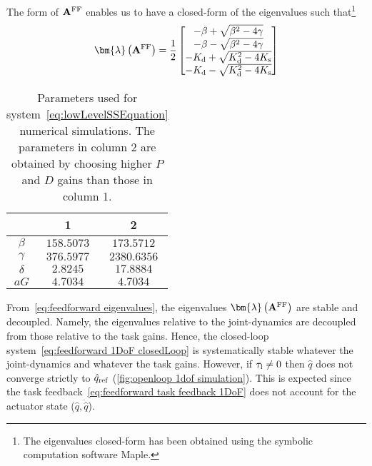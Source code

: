 The form of $\mathbf{A}^{\rm FF}$ enables us to have a closed-form of the eigenvalues such that\footnote{The eigenvalues closed-form has been obtained using the symbolic computation software Maple.} 
\begin{equation}\label{eq:feedforward eigenvalues}
	\bm{\lambda}\left(\mathbf{A}^{\rm FF}\right) = \frac{1}{2}\begin{bmatrix}
		-\beta + \sqrt{\beta^2 - 4\gamma} \\
		-\beta - \sqrt{\beta^2 - 4\gamma} \\
		-K_{\rm d}  + \sqrt{K_{\rm d}^2 - 4K_{\rm s} } \\
		-K_{\rm d}  - \sqrt{K_{\rm d}^2 - 4K_{\rm s} }    
	\end{bmatrix}
\end{equation}
\begin{table}
	\centering		
	\begin{tabular}{|c||c|c|}\hline
		&  1   &  2 \\\hline
		$\beta$&$158.5073$ &$173.5712$ \\\hline
		$\gamma$&$376.5977$ &$2380.6356$ \\\hline
		$\delta$&$2.8245$  &$17.8884$ \\	\hline
		$aG$&$4.7034$    &$4.7034$\\\hline
	\end{tabular}
\caption{Parameters used for system~\eqref{eq:lowLevelSSEquation} numerical simulations. The parameters in column 2 are obtained by choosing higher $P$ and $D$ gains than those in column 1.}
\label{tab:parameters}
\end{table}
From~\cref{eq:feedforward eigenvalues}, the eigenvalues $\bm{\lambda}\left(\mathbf{A}^{\rm FF}\right)$ are stable and decoupled. Namely,  the eigenvalues relative to the joint-dynamics are decoupled from those relative to the task gains. Hence, the closed-loop system~\eqref{eq:feedforward 1DoF closedLoop} is systematically stable whatever the joint-dynamics and whatever the task gains. However, if $\tau_{\rm l}\neq 0 $ then $\hat{q}$ does not converge strictly to $\hat{q}_{\rm ref}$ (\cref{fig:openloop 1dof simulation}). This is expected since the task feedback~\eqref{eq:feedforward task feedback 1DoF} does not account for the actuator state ($\hat{q}, \dot{\hat{q}}$).


